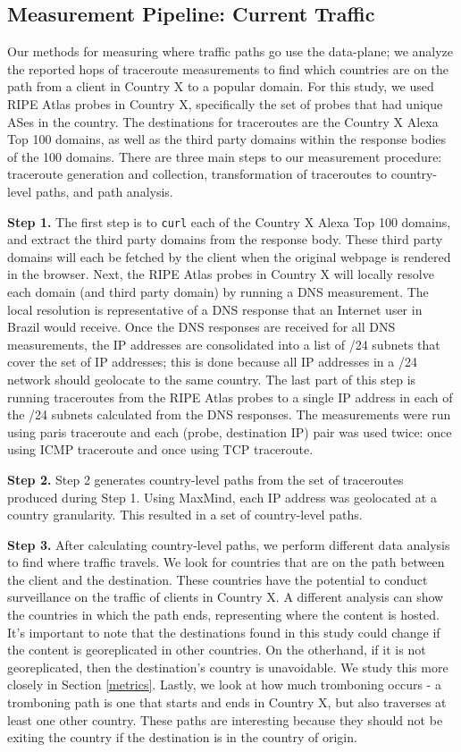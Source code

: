 \subsection{Measurement Pipeline: Current Traffic}
\label{pipeline1}
Our methods for measuring where traffic paths go use the data-plane; we analyze the reported hops of traceroute measurements to find which countries are on the path from a client in Country X to a popular domain.  For this study, we used RIPE Atlas probes in Country X, specifically the set of probes that had unique ASes in the country.  The destinations for traceroutes are the Country X Alexa Top 100 domains, as well as the third party domains within the response bodies of the 100 domains.  There are three main steps to our measurement procedure: traceroute generation and collection, transformation of traceroutes to country-level paths, and path analysis.

{\bf Step 1.} The first step is to {\tt curl} each of the Country X Alexa Top 100 domains, and extract the third party domains from the response body.  These third party domains will each be fetched by the client when the original webpage is rendered in the browser.  Next, the RIPE Atlas probes in Country X will locally resolve each domain (and third party domain) by running a DNS measurement.  The local resolution is representative of a DNS response that an Internet user in Brazil would receive.  Once the DNS responses are received for all DNS measurements, the IP addresses are consolidated into a list of /24 subnets that cover the set of IP addresses; this is done because all IP addresses in a /24 network should geolocate to the same country.  The last part of this step is running traceroutes from the RIPE Atlas probes to a single IP address in each of the /24 subnets calculated from the DNS responses.  The measurements were run using paris traceroute and each (probe, destination IP) pair was used twice: once using ICMP traceroute and once using TCP traceroute.  

{\bf Step 2.}  Step 2 generates country-level paths from the set of traceroutes produced during Step 1.  Using MaxMind, each IP address was geolocated at a country granularity.  This resulted in a set of country-level paths.

{\bf Step 3.}  After calculating country-level paths, we perform different data analysis to find where traffic travels.  We look for countries that are on the path between the client and the destination.  These countries have the potential to conduct surveillance on the traffic of clients in Country X.  A different analysis can show the countries in which the path ends, representing where the content is hosted.  It's important to note that the destinations found in this study could change if the content is georeplicated in other countries.  On the otherhand, if it is not georeplicated, then the destination's country is unavoidable.  We study this more closely in Section \ref{metrics}.  Lastly, we look at how much tromboning occurs - a tromboning path is one that starts and ends in Country X, but also traverses at least one other country.  These paths are interesting because they should not be exiting the country if the destination is in the country of origin.  

